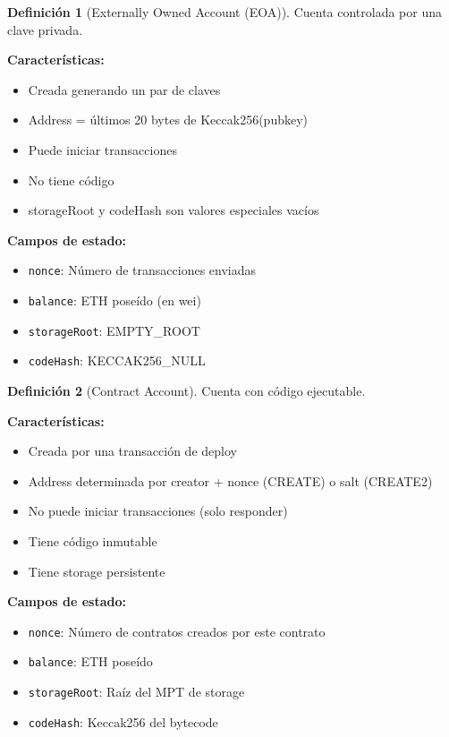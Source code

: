 \documentclass[11pt,a4paper,twoside,openright]{book}
\theoremstyle{definition}
\newtheorem{definition}{Definición}[chapter]
\theoremstyle{plain}
\theoremstyle{remark}
\begin{document}
\begin{definition}[Externally Owned Account (EOA)]
Cuenta controlada por una clave privada.

\textbf{Características:}
\begin{itemize}
    \item Creada generando un par de claves
    \item Address = últimos 20 bytes de Keccak256(pubkey)
    \item Puede iniciar transacciones
    \item No tiene código
    \item storageRoot y codeHash son valores especiales vacíos
\end{itemize}

\textbf{Campos de estado:}
\begin{itemize}
    \item \texttt{nonce}: Número de transacciones enviadas
    \item \texttt{balance}: ETH poseído (en wei)
    \item \texttt{storageRoot}: EMPTY\_ROOT
    \item \texttt{codeHash}: KECCAK256\_NULL
\end{itemize}
\end{definition}

\begin{definition}[Contract Account]
Cuenta con código ejecutable.

\textbf{Características:}
\begin{itemize}
    \item Creada por una transacción de deploy
    \item Address determinada por creator + nonce (CREATE) o salt (CREATE2)
    \item No puede iniciar transacciones (solo responder)
    \item Tiene código inmutable
    \item Tiene storage persistente
\end{itemize}

\textbf{Campos de estado:}
\begin{itemize}
    \item \texttt{nonce}: Número de contratos creados por este contrato
    \item \texttt{balance}: ETH poseído
    \item \texttt{storageRoot}: Raíz del MPT de storage
    \item \texttt{codeHash}: Keccak256 del bytecode
\end{itemize}
\end{definition}
\end{document}
